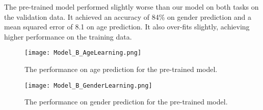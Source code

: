 The pre-trained model performed slightly worse than our model on both tasks on the validation data.
It achieved an accuracy of 84\% on gender prediction and a mean squared error of 8.1 on age
prediction. It also over-fits slightly, achieving higher performance on the training data.

\begin{figure}
    \centering
    \texttt{[image: Model\_B\_AgeLearning.png]}
    \caption{\label{fig:ModelBPerformanceAge} The performance on age prediction for the pre-trained model.}
\end{figure}


\begin{figure}
    \centering
    \texttt{[image: Model\_B\_GenderLearning.png]}
    \caption{\label{fig:ModelBPerformanceGender} The performance on gender prediction for the pre-trained model.}
\end{figure}
